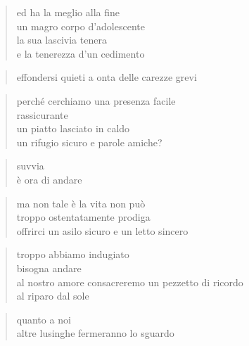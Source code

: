 	\begin{verse}
                ed ha la meglio alla fine\\
                un magro corpo d’adolescente\\
                la sua lascivia tenera\\
                e la tenerezza d’un cedimento
	\end{verse}

	\begin{verse}
                effondersi quieti a onta delle carezze grevi
	\end{verse}

\clearpage


	\begin{verse}
                perché cerchiamo una presenza facile\\
                rassicurante\\
                un piatto lasciato in caldo\\
                un rifugio sicuro e parole amiche?
	\end{verse}

	\begin{verse}
                suvvia\\
                è ora di andare
	\end{verse}

	\begin{verse}
                ma non tale è la vita non può\\
                troppo ostentatamente prodiga\\
                offrirci un asilo sicuro e un letto sincero
	\end{verse}

	\begin{verse}
                troppo abbiamo indugiato\\
                bisogna andare\\
                al nostro amore consacreremo un pezzetto di ricordo\\
                al riparo dal sole
	\end{verse}

	\begin{verse}
                quanto a noi\\
                altre lusinghe fermeranno lo sguardo
	\end{verse}

\clearpage


